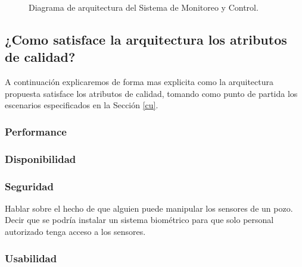 \documentclass{article}
\theoremstyle{definition}
\theoremstyle{remark}
\begin{document}
\begin{figure}[H]
  \caption{Diagrama de arquitectura del Sistema de Monitoreo y Control.}
\end{figure}

\pagebreak

\subsection{¿Como satisface la arquitectura los atributos de calidad?}

A continuación explicaremos de forma mas explicita como la arquitectura propuesta satisface los atributos de calidad, tomando como punto de partida los escenarios especificados en la Sección \ref{cu}.

\subsubsection{Performance}
\subsubsection{Disponibilidad}
\subsubsection{Seguridad}
Hablar sobre el hecho de que alguien puede manipular los sensores de un pozo. Decir que se podría instalar un sistema biométrico para que solo personal autorizado tenga acceso a los sensores.

\subsubsection{Usabilidad}
\end{document}
